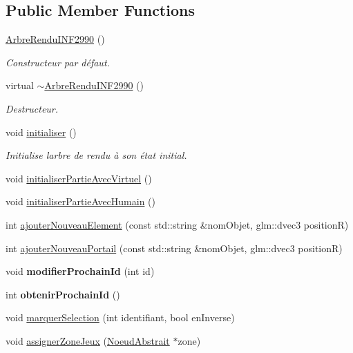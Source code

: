 \subsection*{Public Member Functions}
\begin{DoxyCompactItemize}
\item 
\hyperlink{group__inf2990_ga67528b7fa54e8ef8f96ef2e0bad06d2d}{Arbre\+Rendu\+I\+N\+F2990} ()
\begin{DoxyCompactList}\small\item\em Constructeur par défaut. \end{DoxyCompactList}\item 
virtual \hyperlink{group__inf2990_gaa67526b2fd719f6bcef7a4547bd25c7b}{$\sim$\+Arbre\+Rendu\+I\+N\+F2990} ()
\begin{DoxyCompactList}\small\item\em Destructeur. \end{DoxyCompactList}\item 
void \hyperlink{group__inf2990_ga678d89e1f12ae16ee7dcf6de3db637a3}{initialiser} ()
\begin{DoxyCompactList}\small\item\em Initialise l\textquotesingle{}arbre de rendu à son état initial. \end{DoxyCompactList}\item 
void \hyperlink{group__inf2990_gadfed85438e3f27c913fbe5924e378899}{initialiser\+Partie\+Avec\+Virtuel} ()
\item 
void \hyperlink{group__inf2990_gada983d8cac525061d285dd9ab2a19af8}{initialiser\+Partie\+Avec\+Humain} ()
\item 
int \hyperlink{group__inf2990_ga519bc7e5846e15f457e966d5bbfebf5d}{ajouter\+Nouveau\+Element} (const std\+::string \&nom\+Objet, glm\+::dvec3 positionR)
\item 
int \hyperlink{group__inf2990_ga4f71fa693acb730e4685e2a365d2fd28}{ajouter\+Nouveau\+Portail} (const std\+::string \&nom\+Objet, glm\+::dvec3 positionR)
\item 
\hypertarget{class_arbre_rendu_i_n_f2990_a00fc30fb9a84c745a7a73007e66fce74}{}\label{class_arbre_rendu_i_n_f2990_a00fc30fb9a84c745a7a73007e66fce74} 
void {\bfseries modifier\+Prochain\+Id} (int id)
\item 
\hypertarget{class_arbre_rendu_i_n_f2990_aa9fa6c79c277ea85540bb8e80e7cbac9}{}\label{class_arbre_rendu_i_n_f2990_aa9fa6c79c277ea85540bb8e80e7cbac9} 
int {\bfseries obtenir\+Prochain\+Id} ()
\item 
void \hyperlink{group__inf2990_ga85acac933bea59f80e07860bdef6bece}{marquer\+Selection} (int identifiant, bool en\+Inverse)
\item 
void \hyperlink{group__inf2990_gabc92694f019a765164bfd33619b4cc85}{assigner\+Zone\+Jeux} (\hyperlink{class_noeud_abstrait}{Noeud\+Abstrait} $\ast$zone)
\end{DoxyCompactItemize}
